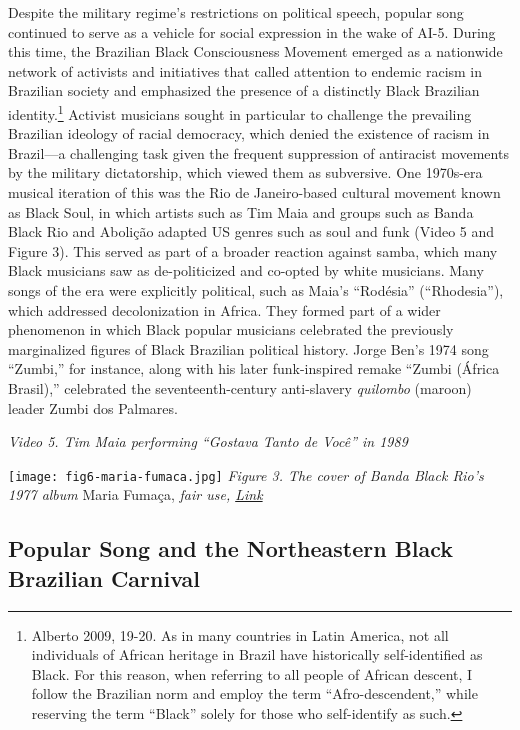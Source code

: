 \documentclass[twoside]{article}
\begin{document}
Despite the military regime's restrictions on political speech, popular
song continued to serve as a vehicle for social expression in the wake
of AI-5. During this time, the Brazilian Black Consciousness Movement
emerged as a nationwide network of activists and initiatives that called
attention to endemic racism in Brazilian society and emphasized the
presence of a distinctly Black Brazilian identity.\footnote{Alberto
  2009, 19-20. As in many countries in Latin America, not all
  individuals of African heritage in Brazil have historically
  self-identified as Black. For this reason, when referring to all
  people of African descent, I follow the Brazilian norm and employ the
  term ``Afro-descendent,'' while reserving the term ``Black'' solely
  for those who self-identify as such.} Activist musicians sought in
particular to challenge the prevailing Brazilian ideology of racial
democracy, which denied the existence of racism in Brazil---a
challenging task given the frequent suppression of antiracist movements
by the military dictatorship, which viewed them as subversive. One
1970s-era musical iteration of this was the Rio de Janeiro-based
cultural movement known as Black Soul, in which artists such as Tim Maia
and groups such as Banda Black Rio and Abolição adapted US genres such
as soul and funk (Video 5 and Figure 3). This served as part of a
broader reaction against samba, which many Black musicians saw as
de-politicized and co-opted by white musicians. Many songs of the era
were explicitly political, such as Maia's ``Rodésia'' (``Rhodesia''),
which addressed decolonization in Africa. They formed part of a wider
phenomenon in which Black popular musicians celebrated the previously
marginalized figures of Black Brazilian political history. Jorge Ben's
1974 song ``Zumbi,'' for instance, along with his later funk-inspired
remake ``Zumbi (África Brasil),'' celebrated the seventeenth-century
anti-slavery \emph{quilombo} (maroon) leader Zumbi dos Palmares.

\emph{Video 5. Tim Maia performing ``Gostava Tanto de Você'' in 1989}

\texttt{[image: fig6-maria-fumaca.jpg]} \emph{Figure 3. The cover of
Banda Black Rio's 1977 album} Maria Fumaça, \emph{fair use,
\href{https://en.wikipedia.org/wiki/Maria_Fumaça\#/media/File:Bandablackrio-mariafumaca1977.jpg}{Link}}

\hypertarget{popular-song-and-the-northeastern-black-brazilian-carnival}{%
\subsection*{Popular Song and the Northeastern Black Brazilian
Carnival}\label{popular-song-and-the-northeastern-black-brazilian-carnival}}
\end{document}
